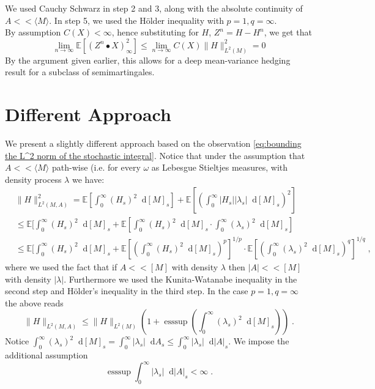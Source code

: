 \documentclass[11pt]{report}
\newcommand{\diff}{\mathop{}\!\mathrm{d}}
\theoremstyle{plain} %
\theoremstyle{definition} %
\theoremstyle{remark} %
\begin{document}
We used Cauchy Schwarz in step 2 and 3, along with the absolute continuity of \(A<<\langle M\rangle\). In step 5, we used the Hölder inequality with \(p=1,q=\infty\).\\
By assumption \(C(X)<\infty\), hence substituting for \(H\), \(Z^n=H-H^n\), we get that 
\begin{equation}
    \lim_{n\to\infty}\mathbb{E}[(Z^n\bullet X)_{\infty}^2]\leq\lim_{n\to\infty}C(X)\lVert H\rVert_{L^2(M)}^2=0
\end{equation}
By the argument given earlier, this allows for a deep mean-variance hedging result for a subclass of semimartingales.
\section{Different Approach}
We present a slightly different approach based on the observation \cref{eq:bounding the L^2 norm of the stochastic integral}. Notice that under the assumption that \(A<<\langle M\rangle\) path-wise (i.e. for every \(\omega\) as Lebesgue Stieltjes measures, with density process \(\lambda\) we have:
\begin{align*}
&\lVert H\rVert_{L^2(M,A)}^2=\mathbb{E}[\int_0^\infty (H_s)^2\diff [M]_s]+\mathbb{E}[\left(\int_0^\infty |H_s||\lambda_s|\diff[M]_s\right)^2]\\&\leq\mathbb{E}[\int_0^\infty (H_s)^2\diff [M]_s+\mathbb{E}[\int_0^{\infty}(H_s)^2\diff [M]_s\cdot\int_0^{\infty}(\lambda_s)^2\diff [M]_s]
\\&
\leq\mathbb{E}[\int_0^\infty (H_s)^2\diff [M]_s+\mathbb{E}[\left(\int_0^{\infty}(H_s)^2\diff [M]_s\right)^{p}]^{1/p}\cdot\mathbb{E}[\left(\int_0^{\infty}(\lambda_s)^2\diff [M]_s\right)^{q}]^{1/q}
\;,
\end{align*}
where we used the fact that if \(A<<[M]\) with density \(\lambda\) then \(|A|<<[M]\) with density \(|\lambda|\). Furthermore we used the Kunita-Watanabe inequality in the second step and Hölder's inequality in the third step. In the case \(p=1,q=\infty\) the above reads
\begin{equation}
    \lVert H\rVert_{L^2(M,A)}\leq\lVert H\rVert_{L^2(M)}\left(1+\operatorname*{ess\sup}\left(\int_0^{\infty}(\lambda_s)^2\diff [M]_s\right)\right)\;.
\end{equation}
Notice \(\int_0^{\infty}(\lambda_s)^2\diff [M]_s=\int_0^{\infty}|\lambda_s|\diff A_s\leq \int_0^{\infty}|\lambda_s|\diff |A|_s\). We impose the additional assumption
\begin{equation}
    \operatorname*{ess\sup}\int_0^{\infty}|\lambda_s|\diff |A|_s<\infty\;.
\end{equation}
\end{document}
